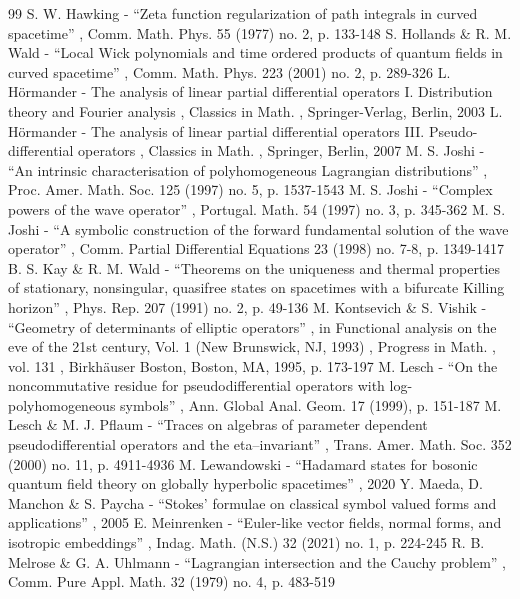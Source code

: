 \begin{thebibliography}{99}
 S. W. Hawking - “Zeta function regularization of path integrals in curved spacetime” , Comm. Math. Phys. 55 (1977) no. 2, p. 133-148
 S. Hollands \& R. M. Wald - “Local Wick polynomials and time ordered products of quantum fields in curved spacetime” , Comm. Math. Phys. 223 (2001) no. 2, p. 289-326
 L. Hörmander - The analysis of linear partial differential operators I. Distribution theory and Fourier analysis , Classics in Math. , Springer-Verlag, Berlin, 2003
 L. Hörmander - The analysis of linear partial differential operators III. Pseudo-differential operators , Classics in Math. , Springer, Berlin, 2007
 M. S. Joshi - “An intrinsic characterisation of polyhomogeneous Lagrangian distributions” , Proc. Amer. Math. Soc. 125 (1997) no. 5, p. 1537-1543
 M. S. Joshi - “Complex powers of the wave operator” , Portugal. Math. 54 (1997) no. 3, p. 345-362
 M. S. Joshi - “A symbolic construction of the forward fundamental solution of the wave operator” , Comm. Partial Differential Equations 23 (1998) no. 7-8, p. 1349-1417
 B. S. Kay \& R. M. Wald - “Theorems on the uniqueness and thermal properties of stationary, nonsingular, quasifree states on spacetimes with a bifurcate Killing horizon” , Phys. Rep. 207 (1991) no. 2, p. 49-136
 M. Kontsevich \& S. Vishik - “Geometry of determinants of elliptic operators” , in Functional analysis on the eve of the 21st century, Vol. 1 (New Brunswick, NJ, 1993) , Progress in Math. , vol. 131 , Birkhäuser Boston, Boston, MA, 1995, p. 173-197
 M. Lesch - “On the noncommutative residue for pseudodifferential operators with log-polyhomogeneous symbols” , Ann. Global Anal. Geom. 17 (1999), p. 151-187
 M. Lesch \& M. J. Pflaum - “Traces on algebras of parameter dependent pseudodifferential operators and the eta–invariant” , Trans. Amer. Math. Soc. 352 (2000) no. 11, p. 4911-4936
 M. Lewandowski - “Hadamard states for bosonic quantum field theory on globally hyperbolic spacetimes” , 2020
 Y. Maeda, D. Manchon \& S. Paycha - “Stokes’ formulae on classical symbol valued forms and applications” , 2005
 E. Meinrenken - “Euler-like vector fields, normal forms, and isotropic embeddings” , Indag. Math. (N.S.) 32 (2021) no. 1, p. 224-245
 R. B. Melrose \& G. A. Uhlmann - “Lagrangian intersection and the Cauchy problem” , Comm. Pure Appl. Math. 32 (1979) no. 4, p. 483-519

\end{thebibliography}

